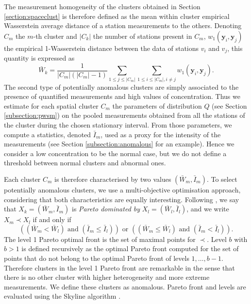 The measurement homogeneity of the clusters obtained in Section \ref{section:spaceclust} is therefore defined as the mean within cluster empirical Wasserstein average distance of a station measurements to the others. Denoting $C_m$ the $m$-th cluster and $|C_k|$ the number of stations present in $C_m$, $w_1(\mathbf{y}_i,\mathbf{y}_j)$ the empirical 1-Wasserstein distance between the data of stations $v_i$ and $v_j$, this quantity is expressed as   
\begin{equation}
    \bar{W}_k = \frac{1}{|C_m|(|C_m|-1)}\sum_{1 \leq j \leq |C_m|}\sum_{1 \leq i \leq |C_m|, i \neq j}w_1(\mathbf{y}_i,\mathbf{y}_j).
\end{equation}
The second type of potentially anomalous clusters are simply associated to the presence of quantified measurements and high values of concentration. Thus we estimate for each spatial cluster $C_m$ the parameters of distribution $Q$ (see Section \ref{subsection:pwsm}) on the pooled measurements obtained from all the stations of the cluster during the chosen stationary interval. From those parameters, we compute a statistics, denoted $\bar{I}_m$, used as a proxy for the intensity of the measurements (see Section \ref{subsection:anomalous} for an example).  Hence we consider a low concentration to be the normal case, but we do not define a threshold between normal clusters and abnormal ones. 

Each cluster $C_m$ is therefore characterised by two values $(\bar{W}_m, \bar{I}_m)$. To select potentially anomalous clusters, we use a multi-objective optimisation approach, considering that both characteristics are equally interesting. Following \cite{KIELING2002311}, we say that  $X_k = (\bar{W}_m, \bar{I}_m)$ is \emph{Pareto dominated by} $X_l = (\bar{W}_l,\bar{I}_l)$, and we write $X_m \prec X_l$ if and only if
\begin{equation*}
    \left((\bar{W}_m<\bar{W}_l)\text{ and }(\bar{I}_m\leq \bar{I}_l)\right)
    \text{ or }\left((\bar{W}_m \leq \bar{W}_l)\text{ and }(\bar{I}_m < \bar{I}_l)\right).
\end{equation*}
The level 1 Pareto optimal front is the set of maximal points for $\prec$. Level $b$ with $b>1$ is defined recursively as the optimal Pareto front computed for the set of points that do not belong to the optimal Pareto front of levels $1,\ldots,b-1$. Therefore clusters in the level 1 Pareto front are remarkable in the sense that there is no other cluster with higher heterogeneity and more extreme measurements. We define these clusters as anomalous. Pareto front and levels are evaluated using the Skyline algorithm \cite{914855,endres2015scalagon}.

